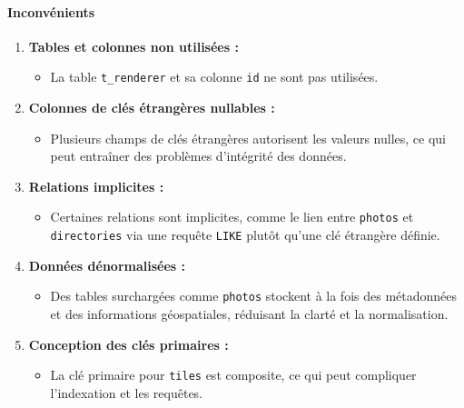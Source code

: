 \paragraph{Inconvénients}
\begin{enumerate}
    \item \textbf{Tables et colonnes non utilisées :}
          \begin{itemize}
              \item La table \texttt{t\_renderer} et sa colonne \texttt{id} ne sont pas utilisées.
          \end{itemize}
    \item \textbf{Colonnes de clés étrangères nullables :}
          \begin{itemize}
              \item Plusieurs champs de clés étrangères autorisent les valeurs nulles, ce qui peut entraîner des problèmes d'intégrité des données.
          \end{itemize}
    \item \textbf{Relations implicites :}
          \begin{itemize}
              \item Certaines relations sont implicites, comme le lien entre \texttt{photos} et \texttt{directories} via une requête \texttt{LIKE} plutôt qu'une clé étrangère définie.
          \end{itemize}
    \item \textbf{Données dénormalisées :}
          \begin{itemize}
              \item Des tables surchargées comme \texttt{photos} stockent à la fois des métadonnées et des informations géospatiales, réduisant la clarté et la normalisation.
          \end{itemize}
    \item \textbf{Conception des clés primaires :}
          \begin{itemize}
              \item La clé primaire pour \texttt{tiles} est composite, ce qui peut compliquer l'indexation et les requêtes.
          \end{itemize}
\end{enumerate}

